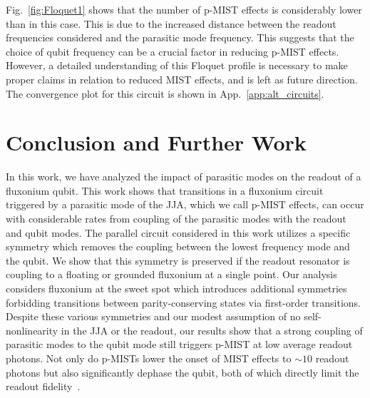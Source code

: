 \documentclass[%
reprint,
superscriptaddress,
 amsmath,amssymb,
 aps,
 prx,
longbibliography,
floatfix,
]{revtex4-2}
\begin{document}
Fig.~\ref{fig:Floquet1} shows that the number of p-MIST effects is considerably lower than in this case. This is due to the increased distance between the readout frequencies considered and the parasitic mode frequency. This suggests that the choice of qubit frequency can be a crucial factor in reducing p-MIST effects. However, a detailed understanding of this Floquet profile is necessary to make proper claims in relation to reduced MIST effects, and is left as future direction. The convergence plot for this circuit is shown in App.~\ref{app:alt_circuits}.

\section{Conclusion and Further Work}\label{sec:conclusion}
In this work, we have analyzed the impact of parasitic modes on the readout of a fluxonium qubit. This work shows that transitions in a fluxonium circuit triggered by a parasitic mode of the JJA, which we call p-MIST effects, can occur with considerable rates from coupling of the parasitic modes with the readout and qubit modes. The parallel circuit considered in this work utilizes a specific symmetry which removes the coupling between the lowest frequency mode and the qubit. We show that this symmetry is preserved if the readout resonator is coupling to a floating or grounded fluxonium at a single point. Our analysis considers fluxonium at the sweet spot which introduces additional symmetries forbidding transitions between parity-conserving states via first-order transitions. Despite these various symmetries and our modest assumption of no self-nonlinearity in the JJA or the readout, our results show that a strong coupling of parasitic modes to the qubit mode still triggers p-MIST at low average readout photons. Not only do p-MISTs lower the onset of MIST effects to $\sim 10$ readout photons but also significantly dephase the qubit, both of which directly limit the readout fidelity~\cite{hazra2024benchmarking}. 
\end{document}
